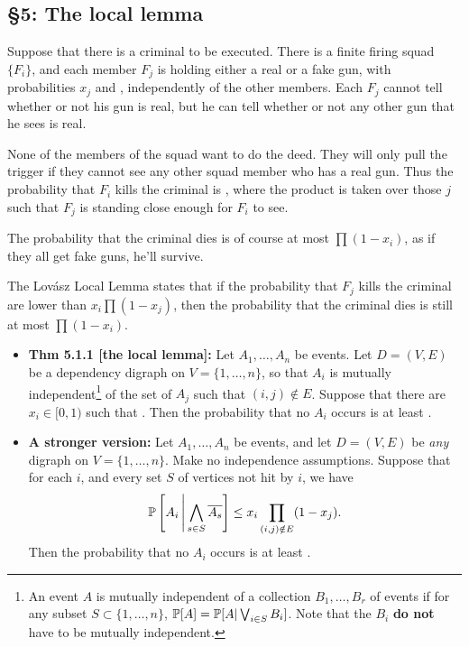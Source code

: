 \documentclass[11pt]{article}
\newenvironment{INT}[1][]{\begin{itemize}\small\item\textbf{#1}}{\end{itemize}}
\newcommand{\moreINT}[1][]{\item\textbf{#1}}
\begin{document}
\begin{chapter5}
\section*{\S5: The local lemma}
\begin{itemise}
\item 
Suppose that there is a criminal to be executed. There is a finite firing squad $\{F_i\}$, and each member $F_j$ is holding either a real or a fake gun, with probabilities $x_j$ and , independently of the other members. Each $F_j$ cannot tell whether or not his gun is real, but he can tell whether or not any other gun that he sees is real.

\INDENT None of the members of the squad want to do the deed. They will only pull the trigger if they cannot see any other squad member who has a real gun. Thus the probability that $F_i$ kills the criminal is , where the product is taken over those $j$ such that $F_j$ is standing close enough for $F_i$ to see.

\INDENT The probability that the criminal dies is of course at most $\prod(1-x_i)$, as if they all get fake guns, he'll survive.

\item The Lov\'asz Local Lemma states that if the probability that $F_j$ kills the criminal are lower than $x_i\prod(1-x_j)$, then the probability that the criminal dies is still at most $\prod(1-x_i)$.
\begin{INT}[Thm 5.1.1 {[the local lemma]}:]
Let $A_1,\ldots,A_n$ be events. Let $D=(V,E)$ be a dependency digraph on $V=\{1,\ldots,n\}$, so that $A_i$ is mutually independent\footnote{An event $A$ is mutually independent of a collection $B_1,\ldots,B_r$ of events if for any subset $S\subset\{1,\ldots,n\}$, $\operatorname{\mathbb{P}}[A]=\operatorname{\mathbb{P}}[A|\bigvee_{i\in S} B_i]$. Note that the $B_i$ \textbf{do not} have to be mutually independent.} of the set of $A_j$ such that $(i,j)\notin E$. Suppose that there are $x_i\in[0,1)$ such that . Then the probability that no $A_i$ occurs is at least .
\moreINT[A stronger version:]
Let $A_1,\ldots,A_n$ be events, and let $D=(V,E)$ be \emph{any} digraph on $V=\{1,\ldots,n\}$. Make no independence assumptions. Suppose that for each $i$, and every set $S$ of vertices not hit by $i$, we have
\[\operatorname{\mathbb{P}}\left[A_i\,\middle|\,\bigwedge_{s\in S}\overline{A_s}\right]\leq x_i\prod_{(i,j)\notin E}(1-x_j).\]
Then  the probability that no $A_i$ occurs is at least .



\end{INT}
\end{itemise}
\end{chapter5}
\end{document}
